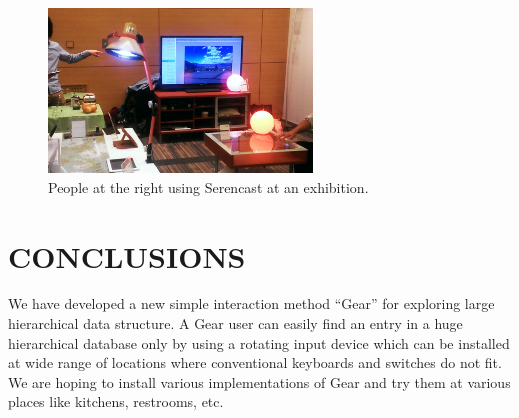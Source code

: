 \documentclass{article}
\def\SC{\textsf{\small Serencast}}
\begin{document}
\begin{figure}[H]
\centerline{\includegraphics[width=70mm,bb=0 0 527 329]{figures/c520d5dfbd06c532d48d324a7019b00c.png}}
\caption{People at the right using {\SC} at an exhibition.}
\label{exhibition}
\end{figure}


\section*{CONCLUSIONS}

We have developed a new simple interaction method ``Gear'' for exploring
large hierarchical data structure.
A Gear user can easily find an entry in a huge hierarchical database
only by using a rotating input device which can be installed at
wide range of locations where conventional keyboards and switches do not fit.
We are hoping to install various implementations of Gear and try them at
various places like kitchens, restrooms, etc.

\small{


}
\end{document}
